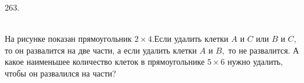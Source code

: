 263. \begin{figure}[ht!]
\end{figure}\\
На рисунке показан прямоугольник $2\times4.$Если удалить клетки $A$ и $C$ или $B$ и $C,$ то он развалится на две части, а если удалить клетки $A$ и $B,$ то не развалится. А какое наименьшее количество клеток в прямоугольнике $5\times6$ нужно удалить, чтобы он развалился на части?\\
